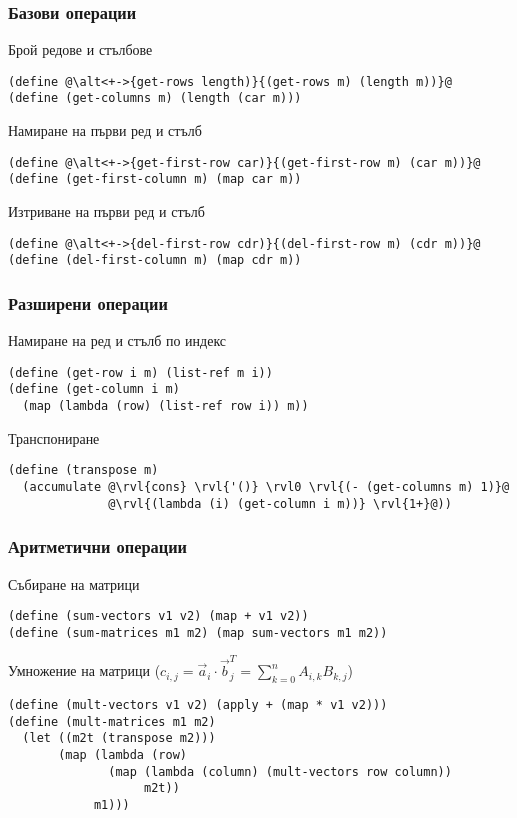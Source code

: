 \documentclass{beamer}
\begin{document}
\begin{frame}[fragile]
  \frametitle{Базови операции}

  Брой редове и стълбове
  \pause
  \onslide<+->
\begin{lstlisting}
(define @\alt<+->{get-rows length)}{(get-rows m) (length m))}@
(define (get-columns m) (length (car m)))
\end{lstlisting}
  \onslide<+->
  Намиране на първи ред и стълб
  \onslide<+->
\begin{lstlisting}
(define @\alt<+->{get-first-row car)}{(get-first-row m) (car m))}@
(define (get-first-column m) (map car m))
\end{lstlisting}
  \onslide<+->
  Изтриване на първи ред и стълб
  \onslide<+->
\begin{lstlisting}
(define @\alt<+->{del-first-row cdr)}{(del-first-row m) (cdr m))}@
(define (del-first-column m) (map cdr m))
\end{lstlisting}
\end{frame}


\begin{frame}[fragile]
  \frametitle{Разширени операции}

  Намиране на ред и стълб по индекс
  \pause
\begin{lstlisting}
(define (get-row i m) (list-ref m i))
(define (get-column i m)
  (map (lambda (row) (list-ref row i)) m))
\end{lstlisting}
  \pause
  Транспониране
  \pause
  \onslide<+->
  \begin{overprint}
\begin{lstlisting}
(define (transpose m)
  (accumulate @\rvl{cons} \rvl{'()} \rvl0 \rvl{(- (get-columns m) 1)}@
              @\rvl{(lambda (i) (get-column i m))} \rvl{1+}@))
\end{lstlisting}
  \end{overprint}
\end{frame}

\begin{frame}[fragile]
  \frametitle{Аритметични операции}

  Събиране на матрици
  \pause
\begin{lstlisting}
(define (sum-vectors v1 v2) (map + v1 v2))
(define (sum-matrices m1 m2) (map sum-vectors m1 m2))
\end{lstlisting}
  \pause
  \vspace{1em}
  Умножение на матрици \pause
  ($c_{i,j} = \vec a_i\cdot \vec b^T_j = \sum_{k=0}^n A_{i,k}B_{k,j}$)
  \pause
  \small
\begin{lstlisting}
(define (mult-vectors v1 v2) (apply + (map * v1 v2)))
(define (mult-matrices m1 m2)
  (let ((m2t (transpose m2)))
       (map (lambda (row)
              (map (lambda (column) (mult-vectors row column))
                   m2t))
            m1)))
\end{lstlisting}
\end{frame}
\end{document}
